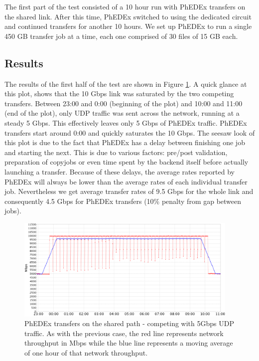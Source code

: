 The first part of the test consisted of a 10 hour run with PhEDEx transfers on the 
shared link. After this time, PhEDEx switched to using the dedicated circuit and
continued transfers for another 10 hours. We set up PhEDEx to run a single 450 GB transfer 
job at a time, each one comprised of 30 files of 15 GB each.

\subsection{Results}

The results of the first half of the test are shown in Figure \ref{fig:shared_transfers}.
A quick glance at this plot, shows that the 10 Gbps link was saturated by the two
competing transfers. Between 23:00 and 0:00 (beginning of the plot) and 
10:00 and 11:00 (end of the plot), only UDP traffic was sent across the network, 
running at a steady 5 Gbps. This effectively leaves only 5 Gbps of PhEDEx traffic.
PhEDEx transfers start around 0:00 and quickly saturates the 10 Gbps. 
The seesaw look of this plot is due to the fact that PhEDEx has a delay
between finishing one job and starting the next. This is due to various factors:
 pre/post validation, preparation of copyjobs or even time spent by the backend itself 
 before actually launching a transfer. Because of these delays, the average 
 rates reported by PhEDEx will always be lower than the average rates of each
 individual transfer job. Nevertheless we get average transfer rates of 9.5 Gbps for the
 whole link and consequently 4.5 Gbps for PhEDEx transfers (10\% penalty from
 gap between jobs).

\begin{figure}[h]
  \centering
  \includegraphics[width=0.95\textwidth]{Figures/FileDownload_Shared_path.png}
  \caption{PhEDEx transfers on the shared path - competing with 5Gbps UDP traffic. As with
  the previous case, the red line represents network throughput in Mbps while the blue
  line represents a moving average of one hour of that network throughput.}
  \label{fig:shared_transfers}
\end{figure} 

